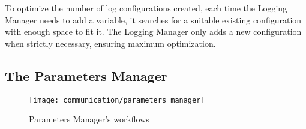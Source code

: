 To optimize the number of log configurations created, each time the Logging Manager needs to add a variable, 
it searches for a suitable existing configuration with enough space to fit it. 
The Logging Manager only adds a new configuration when strictly necessary, ensuring maximum optimization.

\subsection{The Parameters Manager}\label{subsec:parameter_manager}

\begin{figure}[h]
    \centering
    \texttt{[image: communication/parameters\_manager]}
    \caption{Parameters Manager's workflows}\label{fig:parameters}
\end{figure}

